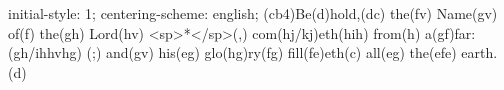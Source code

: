 initial-style: 1;
centering-scheme: english;
(cb4)Be(d)hold,(dc) the(fv) Name(gv) of(f) the(gh) Lord(hv) <sp>*</sp>(,) com(hj/kj)eth(hih) from(h) a(gf)far:(gh/ihhvhg) (;) and(gv) his(eg) glo(hg)ry(fg) fill(fe)eth(c) all(eg) the(efe) earth.(d)
